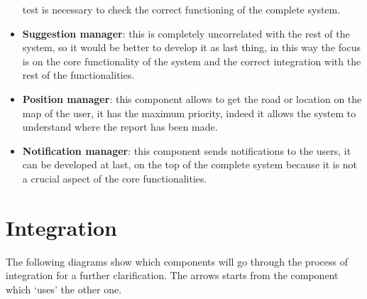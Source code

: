 \documentclass[12pt,a4paper]{report}
\begin{document}
\begin{itemize}
					test is necessary to check the correct functioning of the complete system.  
				\item \textbf{Suggestion manager}: this is completely uncorrelated with the rest of the system, so it would be
					better to develop it as last thing, in this way the focus is on the core functionality of the system and
					the correct integration with the rest of the functionalities.
				\item \textbf{Position manager}: this component allows to get the road or location on the map of the
					user, it has the maximum priority, indeed it allows the system to understand where the report has been
					made.
				\item \textbf{Notification manager}: this component sends notifications to the users, it can be developed at
					last, on the top of the complete system because it is not a crucial aspect of the core functionalities.
			\end{itemize}
		\section{Integration}
		The following diagrams show which components will go through the process of 
			integration for a further clarification. The arrows starts from the component which ‘uses’ the other one.
\end{document}
